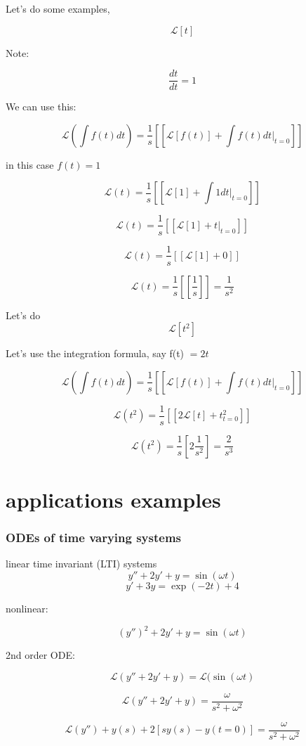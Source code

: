 \documentclass[17pt]{extarticle}
\begin{document}
Let's do some examples,

$$\mathcal{L}[t]$$

Note:

$$\frac{d t}{dt} =1 $$

We can use this:

$$ \mathcal{L} (\int f(t) dt) = \frac{1}{s} \left[ [\mathcal{L} [ f(t)] + \int f (t) dt|_{t = 0} ]  \right]$$

in this case $f(t)=1$

$$ \mathcal{L} (t) = \frac{1}{s} \left[ [\mathcal{L} [1] + \int 1 dt|_{t = 0} ]  \right]$$

$$ \mathcal{L} (t) = \frac{1}{s} \left[ [\mathcal{L} [1] + t|_{t = 0} ]  \right]$$

$$ \mathcal{L} (t) = \frac{1}{s} \left[ [\mathcal{L} [1] + 0 ]  \right]$$

$$ \mathcal{L} (t) = \frac{1}{s} \left[ [\frac{1}{s} ]  \right] = \frac{1}{s^2}$$


Let's do 
$$\mathcal{L}[t^2]$$


Let's use the integration formula, say f(t) $=2t$

$$ \mathcal{L} (\int f(t) dt) = \frac{1}{s} \left[ [\mathcal{L} [ f(t)] + \int f (t) dt|_{t = 0} ]  \right]$$


$$ \mathcal{L} (t^2) = \frac{1}{s} \left[ [2\mathcal{L} [ t]   + t^2_{t = 0} ]  \right]$$

$$ \mathcal{L} (t^2) = \frac{1}{s}  [2 \frac{1}{s^2} ] = \frac{2}{s^3}  $$

\part{applications examples}

\section{ODEs of time varying systems}

linear time invariant (LTI) systems
$$y'' + 2y' + y = \sin (\omega t)$$
$$y'+3y = \exp(-{2t}) + 4$$

nonlinear:

$$(y'')^2 + 2y' + y = \sin (\omega t)$$

2nd order ODE:

$$\mathcal{L}(y''+2y'+y)= \mathcal{L}(\sin (\omega t)$$


$$\mathcal{L}(y''+2y'+y)= \frac{\omega}{s^2 + \omega^2}$$

$$\mathcal{L}(y'') + y(s) + 2[s y(s) - y(t=0)]= \frac{\omega}{s^2 + \omega^2}$$
\end{document}
